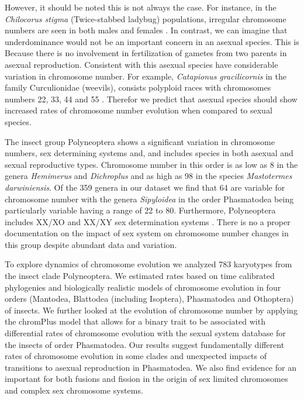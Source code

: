 However, it should be noted this is not always the case. For instance, in the \textit{Chilocorus stigma} (Twice-stabbed ladybug) populations, irregular chromosome numbers are seen in both males and females \citep{smith1962}.  
In contrast, we can imagine that underdominance would not be an important concern in an asexual species. 
This is Because there is no involvement in fertilization of gametes from two parents in asexual reproduction.
Consistent with this asexual species have considerable variation in chromosome number. 
For example, \textit{Catapionus gracilicornis} in the family Curculionidae (weevils), consists polyploid races with chromosomes numbers 22, 33, 44 and 55 \citep{lachowska1998}. 
Therefor we predict that asexual species should show increased rates of chromosome number evolution when compared to sexual species.

The insect group Polyneoptera shows a significant variation in chromosome numbers, sex determining systems and, and includes species in both asexual and sexual reproductive types. 
Chromosome number in this order is as low as 8 in the genera \textit{Hemimerus} and \textit{Dichroplus} and as high as 98 in the species \textit{Mastotermes darwiniensis}.
Of the 359 genera in our dataset we find that 64 are variable for chromosome number with the genera \textit{Sipyloidea} in the order Phasmatodea being particularly variable having a range of 22 to 80. 
Furthermore, Polyneoptera includes XX/XO and XX/XY sex determination systems \citep{blackmon2016}. 
There is no a proper documentation on the impact of sex system on chromosome number changes in this group despite abundant data and variation. 

To explore dynamics of chromosome evolution we analyzed 783 karyotypes from the insect clade Polyneoptera.
We estimated rates based on time calibrated phylogenies and biologically realistic models of chromosome evolution in four orders (Mantodea, Blattodea (including Isoptera), Phasmatodea and Othoptera) of insects.
We further looked at the evolution of chromosome number by applying the chromPlus model that allows for a binary trait to be associated with differential rates of chromosome evolution with the sexual system database for the insects of order Phasmatodea.
Our results suggest fundamentally different rates of chromosome evolution in some clades and unexpected impacts of transitions to asexual reproduction in Phasmatodea. 
We also find evidence for an important for both fusions and fission in the origin of sex limited chromosomes and complex sex chromosome systems.